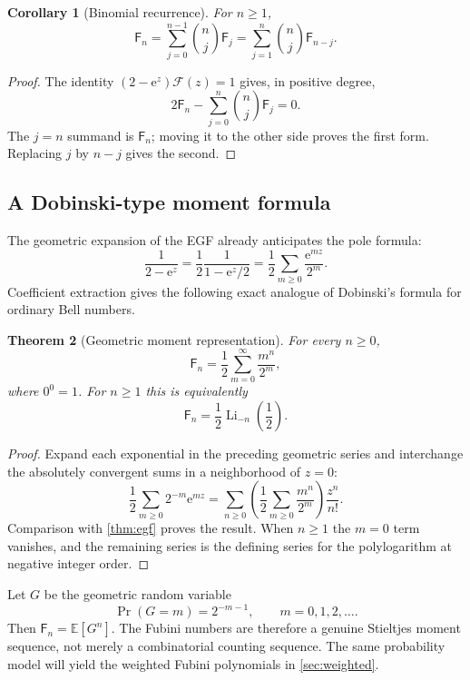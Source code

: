 \documentclass[11pt,a4paper,oneside]{article}
\newtheorem{theorem}{Theorem}[section]
\newtheorem{corollary}[theorem]{Corollary}
\theoremstyle{definition}
\theoremstyle{remark}
\newcommand{\Fub}{\mathsf{F}}
\newcommand{\Li}{\operatorname{Li}}
\newcommand{\e}{\mathrm{e}}
\begin{document}
\begin{corollary}[Binomial recurrence]\label{cor:recurrence}
For $n\ge1$,
\[
 \Fub_n=\sum_{j=0}^{n-1}\binom{n}{j}\Fub_j
       =\sum_{j=1}^{n}\binom{n}{j}\Fub_{n-j}.
\]
\end{corollary}

\begin{proof}
The identity $(2-\e^z)\mathcal F(z)=1$ gives, in positive degree,
\[
 2\Fub_n-\sum_{j=0}^{n}\binom{n}{j}\Fub_j=0.
\]
The $j=n$ summand is $\Fub_n$; moving it to the other side proves the first
form.  Replacing $j$ by $n-j$ gives the second.
\end{proof}

\subsection{A Dobinski-type moment formula}
The geometric expansion of the EGF already anticipates the pole formula:
\[
 \frac{1}{2-\e^z}
 =\frac12\frac{1}{1-\e^z/2}
 =\frac12\sum_{m\ge0}\frac{\e^{mz}}{2^m}.
\]
Coefficient extraction gives the following exact analogue of Dobinski's
formula for ordinary Bell numbers.

\begin{theorem}[Geometric moment representation]\label{thm:moment}
For every $n\ge0$,
\[
 \Fub_n=\frac12\sum_{m=0}^{\infty}\frac{m^n}{2^m},
\]
where $0^0=1$.  For $n\ge1$ this is equivalently
\[
 \Fub_n=\frac12\Li_{-n}\!\left(\frac12\right).
\]
\end{theorem}

\begin{proof}
Expand each exponential in the preceding geometric series and interchange the
absolutely convergent sums in a neighborhood of $z=0$:
\[
 \frac12\sum_{m\ge0}2^{-m}\e^{mz}
 =\sum_{n\ge0}\left(\frac12\sum_{m\ge0}\frac{m^n}{2^m}\right)
  \frac{z^n}{n!}.
\]
Comparison with \cref{thm:egf} proves the result.  When $n\ge1$ the $m=0$
term vanishes, and the remaining series is the defining series for the
polylogarithm at negative integer order.
\end{proof}

\begin{interpretbox}
Let $G$ be the geometric random variable
\[
 \Pr(G=m)=2^{-m-1},\qquad m=0,1,2,\ldots.
\]
Then $\Fub_n=\mathbb E[G^n]$.  The Fubini numbers are therefore a genuine Stieltjes
moment sequence, not merely a combinatorial counting sequence.  The same
probability model will yield the weighted Fubini polynomials in
\cref{sec:weighted}.
\end{interpretbox}
\end{document}
